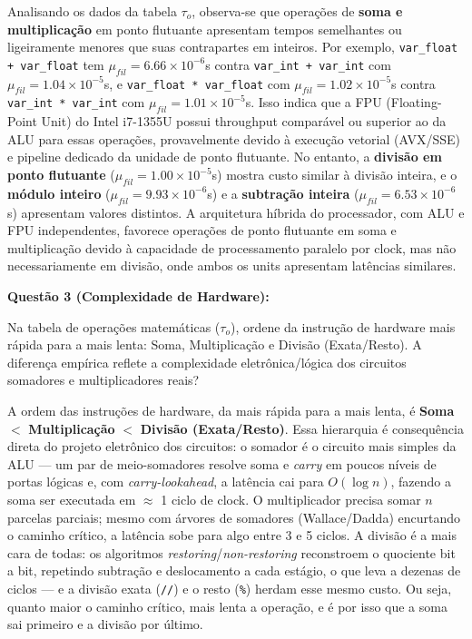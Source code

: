 \documentclass[12pt,a4paper]{article}
\newcommand{\codigo}[1]{\texttt{#1}}
\begin{document}
Analisando os dados da tabela $\tau_o$, observa-se que operações de \textbf{soma e multiplicação} em ponto flutuante apresentam tempos semelhantes ou ligeiramente menores que suas contrapartes em inteiros. Por exemplo, \codigo{var\_float + var\_float} tem $\mu_{fil} = 6.66 \times 10^{-6}$s contra \codigo{var\_int + var\_int} com $\mu_{fil} = 1.04 \times 10^{-5}$s, e \codigo{var\_float * var\_float} com $\mu_{fil} = 1.02 \times 10^{-5}$s contra \codigo{var\_int * var\_int} com $\mu_{fil} = 1.01 \times 10^{-5}$s. Isso indica que a FPU (Floating-Point Unit) do Intel i7-1355U possui throughput comparável ou superior ao da ALU para essas operações, provavelmente devido à execução vetorial (AVX/SSE) e pipeline dedicado da unidade de ponto flutuante. No entanto, a \textbf{divisão em ponto flutuante} ($\mu_{fil} = 1.00 \times 10^{-5}$s) mostra custo similar à divisão inteira, e o \textbf{módulo inteiro} ($\mu_{fil} = 9.93 \times 10^{-6}$s) e a \textbf{subtração inteira} ($\mu_{fil} = 6.53 \times 10^{-6}$s) apresentam valores distintos. A arquitetura híbrida do processador, com ALU e FPU independentes, favorece operações de ponto flutuante em soma e multiplicação devido à capacidade de processamento paralelo por clock, mas não necessariamente em divisão, onde ambos os units apresentam latências similares.

\vspace{0.55cm}

\textbf{Questão 3 (Complexidade de Hardware):}

Na tabela de operações matemáticas ($\tau_o$), ordene da instrução de hardware mais rápida para a mais
lenta: Soma, Multiplicação e Divisão (Exata/Resto). A diferença empírica reflete a complexidade
eletrônica/lógica dos circuitos somadores e multiplicadores reais?

\vspace{0.55cm}

A ordem das instruções de hardware, da mais rápida para a mais lenta, é \textbf{Soma} $<$
\textbf{Multiplicação} $<$ \textbf{Divisão (Exata/Resto)}. Essa hierarquia é consequência direta do
projeto eletrônico dos circuitos: o somador é o circuito mais simples da ALU — um par de meio-somadores
resolve soma e \textit{carry} em poucos níveis de portas lógicas e, com \textit{carry-lookahead}, a
latência cai para $O(\log n)$, fazendo a soma ser executada em $\approx$ 1 ciclo de clock. O multiplicador
precisa somar $n$ parcelas parciais; mesmo com árvores de somadores (Wallace/Dadda) encurtando o caminho
crítico, a latência sobe para algo entre 3 e 5 ciclos. A divisão é a mais cara de todas: os algoritmos
\textit{restoring}/\textit{non-restoring} reconstroem o quociente bit a bit, repetindo subtração e
deslocamento a cada estágio, o que leva a dezenas de ciclos — e a divisão exata (\codigo{//}) e o resto
(\codigo{\%}) herdam esse mesmo custo. Ou seja, quanto maior o caminho crítico, mais lenta a operação, e é
por isso que a soma sai primeiro e a divisão por último.
\end{document}
